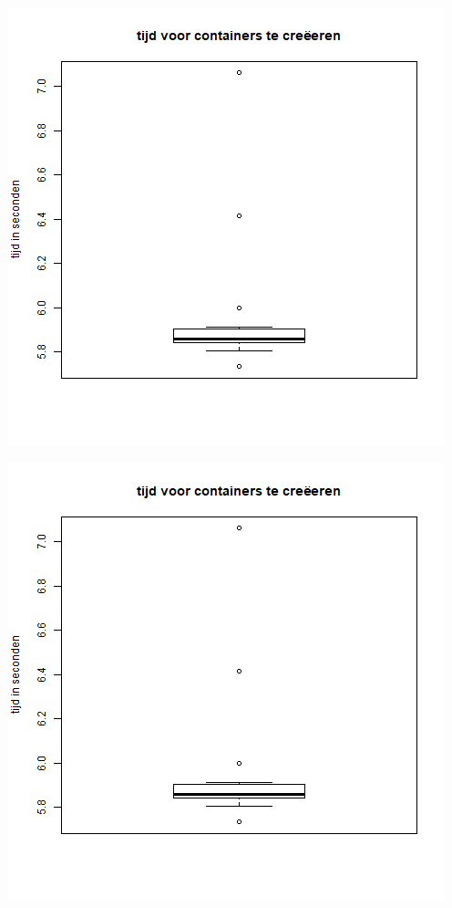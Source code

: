 \begin{center}
	\includegraphics[scale=0.5]{img/centosboxplotprovision.png}
\end{center}

\begin{center}
	\includegraphics[scale=0.5]{img/centosboxplotprovision.png}
\end{center}


